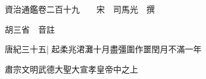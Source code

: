 






























































資治通鑑卷二百十九　　宋　司馬光　撰

胡三省　音註

唐紀三十五|{
	起柔兆涒灘十月盡彊圍作噩閏月不滿一年}


肅宗文明武德大聖大宣孝皇帝中之上

